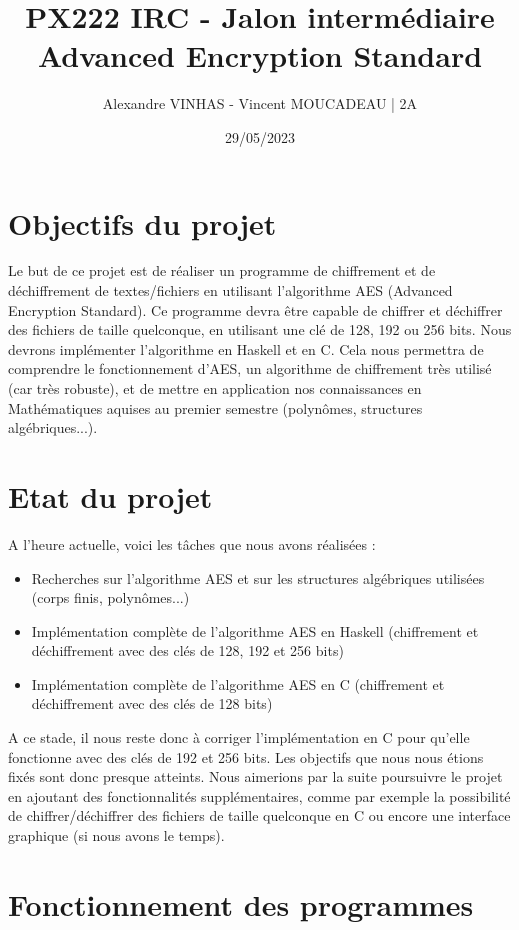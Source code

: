 \documentclass[12pt]{article}
\title{PX222 IRC - Jalon intermédiaire \\ Advanced Encryption Standard}
\author{Alexandre VINHAS - Vincent MOUCADEAU | 2A}
\date{29/05/2023}
\begin{document}
\maketitle



\section{Objectifs du projet}
Le but de ce projet est de réaliser un programme de chiffrement et de déchiffrement de textes/fichiers en utilisant l'algorithme AES (Advanced Encryption Standard). Ce programme devra être capable de chiffrer et déchiffrer des fichiers de taille quelconque, en utilisant une clé de 128, 192 ou 256 bits. Nous devrons implémenter l'algorithme en Haskell et en C. Cela nous permettra de comprendre le fonctionnement d'AES, un algorithme de chiffrement très utilisé (car très robuste), et de mettre en application nos connaissances en Mathématiques aquises au premier semestre (polynômes, structures algébriques...).

\section{Etat du projet}
\noindent A l'heure actuelle, voici les tâches que nous avons réalisées :
\begin{itemize}
    \item Recherches sur l'algorithme AES et sur les structures algébriques utilisées (corps finis, polynômes...)
    \item Implémentation complète de l'algorithme AES en Haskell (chiffrement et déchiffrement avec des clés de 128, 192 et 256 bits)
    \item Implémentation complète de l'algorithme AES en C (chiffrement et déchiffrement avec des clés de 128 bits)
\end{itemize}
A ce stade, il nous reste donc à corriger l'implémentation en C pour qu'elle fonctionne avec des clés de 192 et 256 bits. Les objectifs que nous nous étions fixés sont donc presque atteints. Nous aimerions par la suite poursuivre le projet en ajoutant des fonctionnalités supplémentaires, comme par exemple la possibilité de chiffrer/déchiffrer des fichiers de taille quelconque en C ou encore une interface graphique (si nous avons le temps). 

\section{Fonctionnement des programmes}
\end{document}
